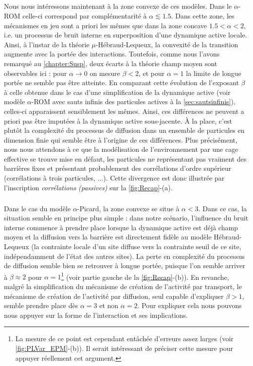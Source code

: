 \subparagraph{}Nous nous intéressons maintenant à la zone convexe de ces modèles. Dans le $\alpha$-ROM celle-ci correspond par complémentarité à $\alpha\lesssim 1.5$. Dans cette zone, les mécanismes en jeu sont a priori les mêmes que dans la zone concave $1.5 < \alpha < 2$, i.e. un processus de bruit interne en superposition d'une dynamique active locale. Ainsi, à l'instar de la théorie $\mu$-Hébraud-Lequeux, la convexité de la transition augmente avec la portée des interactions. Toutefois, comme nous l'avons remarqué au \autoref{chapter:Susp}, deux écarts à la théorie champ moyen sont observables ici : pour $\alpha \rightarrow 0$ on mesure $\beta < 2$, et pour $\alpha = 1$ la limite de longue portée ne semble pas être atteinte. En comparant cette évolution de l'exposant $\beta$ à celle obtenue dans le cas d'une simplification de la dynamique active (voir modèle $\alpha$-ROM avec sauts infinis des particules actives à la \autoref{sec:sautsinfinis}), celles-ci apparaissent sensiblement les mêmes. Ainsi, ces différences ne peuvent a priori pas être imputées à la dynamique active sous-jacente. \`A la place, c'est plutôt la complexité du processus de diffusion dans un ensemble de particules en dimension finie qui semble être à l'origine de ces différences. Plus précisément, nous nous attendons à ce que la modélisation de l'environnement par une cage effective se trouve mise en défaut, les particules ne représentant pas vraiment des barrières fixes et présentant probablement des corrélations d'ordre supérieur (corrélations à trois particules, ...). Cette divergence est donc illustrée par l'inscription \textit{corrélations (passives)} sur la \autoref{fig:Recap}-(a).

\subparagraph{}Dans le cas du modèle $\alpha$-Picard, la zone convexe se situe à $\alpha < 3$. Dans ce cas, la situation semble en principe plus simple : dans notre scénario, l'influence du bruit interne commence à prendre place lorsque la dynamique active est déjà champ moyen et la diffusion vers la barrière est directement fidèle au modèle Hébraud-Lequeux (la contrainte locale d'un site diffuse vers la contrainte seuil de ce site, indépendamment de l'état des autres sites). La perte en complexité du processus de diffusion semble bien se retrouver à longue portée, puisque l'on semble arriver à $\beta \approx 2$ pour $\alpha = 1$\footnote{La mesure de ce point est cependant entâchée d'erreurs assez larges (voir \autoref{fig:PLVar_EPM}-(b)). Il serait intéressant de préciser cette mesure pour appuyer réellement cet argument.} (voir partie gauche de la \autoref{fig:Recap}-(b)). En revanche, malgré la simplification du mécanisme de création de l'activité par transport, le mécanisme de création de l'activité par diffusion, seul capable d'expliquer $\beta >1$, semble prendre place dès $\alpha=3$ et non $\alpha = 2$. Pour expliquer cela nous pouvons nous appuyer sur la forme de l'interaction et ses implications.

